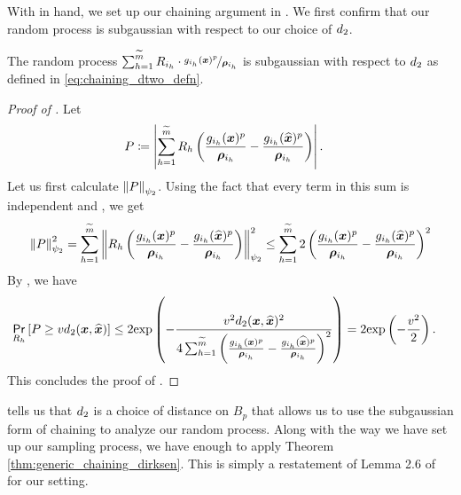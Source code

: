 \documentclass[11pt]{article}
\numberwithin{equation}{section}
\begin{document}
With  in hand, we set up our chaining argument in . We first confirm that our random process is subgaussian with respect to our choice of $d_2$. 
\begin{lemma}
\label{lemma:chaining_setup}
The random process $\sum_{h=1}^{\widetilde{m}} R_{i_h}\cdot\nicefrac{g_{i_h}(\bm{x})^p}{\bm{\rho}_{i_h}}$  is subgaussian with respect to $d_2$ as defined in  \eqref{eq:chaining_dtwo_defn}.
\end{lemma}
\begin{proof}[Proof of ]
Let
\begin{align*}
    P &\coloneqq \left\lvert \sum_{h=1}^{\widetilde{m}} R_{h}\left(\frac{g_{i_h}(\bm{x})^p}{\bm{\rho}_{i_h}} - \frac{g_{i_h}(\widehat{\bm{x}})^p}{\bm{\rho}_{i_h}}\right) \right\rvert.
\end{align*}
Let us first calculate $\left\lVert P \right\rVert_{\psi_2}$. Using the fact that every term in this sum is independent and , we get
\begin{align*}
    \left\lVert P \right\rVert_{\psi_2}^2 = \sum_{h=1}^{\widetilde{m}} \left\lVert R_{h}\left(\frac{g_{i_h}(\bm{x})^p}{\bm{\rho}_{i_h}} - \frac{g_{i_h}(\widehat{\bm{x}})^p}{\bm{\rho}_{i_h}}\right) \right\rVert_{\psi_2}^2 \le \sum_{h=1}^{\widetilde{m}} 2\left(\frac{g_{i_h}(\bm{x})^p}{\bm{\rho}_{i_h}} - \frac{g_{i_h}(\widehat{\bm{x}})^p}{\bm{\rho}_{i_h}}\right)^2
\end{align*}
By , we have
\begin{align*}
    \underset{R_{h}}{\mathsf{Pr}}\left[P \ge vd_2(\bm{x},\widehat{\bm{x}})\right] &\le 2\mathrm{exp}\left(-\frac{v^2d_2(\bm{x},\widehat{\bm{x}})^2}{4\sum_{h=1}^{\widetilde{m}} \left(\frac{g_{i_h}(\bm{x})^p}{\bm{\rho}_{i_h}} - \frac{g_{i_h}(\widehat{\bm{x}})^p}{\bm{\rho}_{i_h}}\right)^2}\right) = 2\mathrm{exp}\left(-\frac{v^2}{2}\right).
\end{align*}
This concludes the proof of .
\end{proof}
 tells us that $d_2$ is a choice of distance on $B_{p}$ that allows us to use the subgaussian form of chaining to analyze our random process. Along with the way we have set up our sampling process, we have enough to apply Theorem \ref{thm:generic_chaining_dirksen}. This is simply a restatement of Lemma 2.6 of \cite{jlls23} for our setting.
\end{document}
